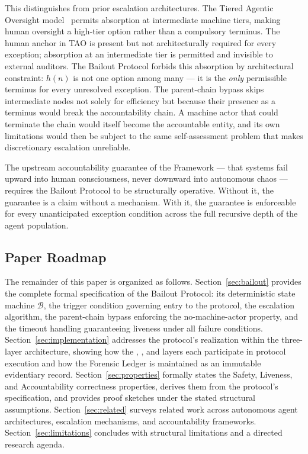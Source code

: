 This distinguishes \bxthree{} from prior escalation architectures. The Tiered Agentic Oversight model~\cite{kim2025tao} permits absorption at intermediate machine tiers, making human oversight a high-tier option rather than a compulsory terminus. The human anchor in TAO is present but not architecturally required for every exception; absorption at an intermediate tier is permitted and invisible to external auditors. The Bailout Protocol forbids this absorption by architectural constraint: $h(n)$ is not one option among many --- it is the \emph{only} permissible terminus for every unresolved exception. The parent-chain bypass skips intermediate nodes not solely for efficiency but because their presence as a terminus would break the accountability chain. A machine actor that could terminate the chain would itself become the accountable entity, and its own limitations would then be subject to the same self-assessment problem that makes discretionary escalation unreliable.

The upstream accountability guarantee of the \bxthree{} Framework --- that \bxthree{} systems fail upward into human consciousness, never downward into autonomous chaos --- requires the Bailout Protocol to be structurally operative. Without it, the guarantee is a claim without a mechanism. With it, the guarantee is enforceable for every unanticipated exception condition across the full recursive depth of the agent population.

\subsection{Paper Roadmap}

The remainder of this paper is organized as follows. Section~\ref{sec:bailout} provides the complete formal specification of the Bailout Protocol: its deterministic state machine $\mathcal{B}$, the trigger condition governing entry to the protocol, the escalation algorithm, the parent-chain bypass enforcing the no-machine-actor property, and the timeout handling guaranteeing liveness under all failure conditions. Section~\ref{sec:implementation} addresses the protocol's realization within the \bxthree{} three-layer architecture, showing how the \purpose{}, \bounds{}, and \fact{} layers each participate in protocol execution and how the Forensic Ledger is maintained as an immutable evidentiary record. Section~\ref{sec:properties} formally states the Safety, Liveness, and Accountability correctness properties, derives them from the protocol's specification, and provides proof sketches under the stated structural assumptions. Section~\ref{sec:related} surveys related work across autonomous agent architectures, escalation mechanisms, and accountability frameworks. Section~\ref{sec:limitations} concludes with structural limitations and a directed research agenda.
